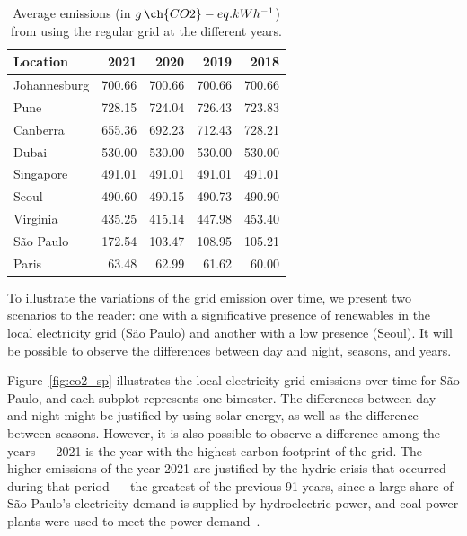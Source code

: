 \begin{table}[h]
  \caption{Average emissions (in $g\,\ch{CO2}-eq.kWh^{-1}$) from using the regular grid at the different years.}\label{tab:grid_emissions_avg_year} \centering
  \begin{tabular}{|l|r|r|r|r|}    
  \hline   
  \textbf{Location} &  \textbf{2021} & \textbf{2020} & \textbf{2019} & \textbf{2018}\\
  \hline
  Johannesburg & 700.66 & 700.66 & 700.66 & 700.66  \\
  \hline
  Pune & 728.15 & 724.04 & 726.43 & 723.83     \\
  \hline
  Canberra & 655.36 & 692.23 & 712.43 & 728.21\\
  \hline
  Dubai & 530.00  & 530.00 & 530.00 & 530.00     \\
  \hline
  Singapore & 491.01 & 491.01 & 491.01 & 491.01 \\
  \hline     
  Seoul & 490.60 & 490.15 & 490.73 & 490.90     \\
  \hline
  Virginia  & 435.25 & 415.14 & 447.98 & 453.40 \\
  \hline
  São Paulo &  172.54 &  103.47 & 108.95 &  105.21 \\
  \hline 
  Paris &  63.48  & 62.99 & 61.62   & 60.00   \\
  \hline

\end{tabular}  
\end{table}


To illustrate the variations of the grid emission over time, we present two scenarios to the reader: one with a significative presence of renewables in the local electricity grid (São Paulo) and another with a low presence (Seoul). It will be possible to observe the differences between day and night, seasons, and years.


Figure~\ref{fig:co2_sp} illustrates the local electricity grid emissions over time for São Paulo, and each subplot represents one bimester. The differences between day and night might be justified by using solar energy, as well as the difference between seasons. However, it is also possible to observe a difference among the years --- 2021 is the year with the highest carbon footprint of the grid. The higher emissions of the year 2021 are justified by the hydric crisis that occurred during that period --- the greatest of the previous 91 years, since a large share of São Paulo's electricity demand is supplied by hydroelectric power, and coal power plants were used to meet the power demand~\cite{CNN2021_crisehidrica}. %

